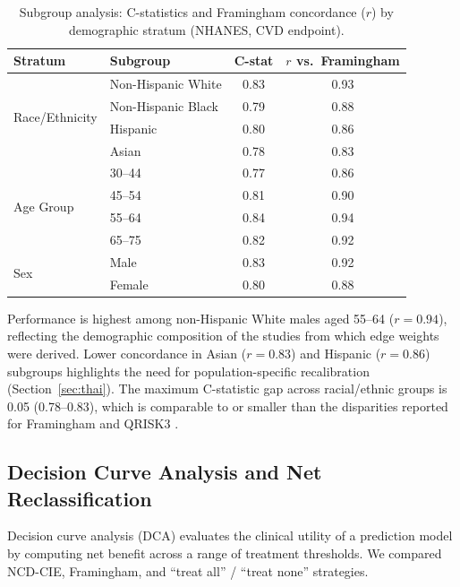 \documentclass[runningheads]{llncs}
\begin{document}
\begin{table}[t]
\centering
\caption{Subgroup analysis: C-statistics and Framingham concordance
($r$) by demographic stratum (NHANES, CVD endpoint).}
\label{tab:subgroup}
\small
\begin{tabular}{@{}llcc@{}}
\toprule
\textbf{Stratum} & \textbf{Subgroup} & \textbf{C-stat} & \textbf{$r$ vs.\ Framingham} \\
\midrule
\multirow{4}{*}{Race/Ethnicity}
  & Non-Hispanic White  & 0.83 & 0.93 \\
  & Non-Hispanic Black  & 0.79 & 0.88 \\
  & Hispanic            & 0.80 & 0.86 \\
  & Asian               & 0.78 & 0.83 \\
\midrule
\multirow{4}{*}{Age Group}
  & 30--44              & 0.77 & 0.86 \\
  & 45--54              & 0.81 & 0.90 \\
  & 55--64              & 0.84 & 0.94 \\
  & 65--75              & 0.82 & 0.92 \\
\midrule
\multirow{2}{*}{Sex}
  & Male                & 0.83 & 0.92 \\
  & Female              & 0.80 & 0.88 \\
\bottomrule
\end{tabular}
\end{table}

Performance is highest among non-Hispanic White males aged 55--64
($r = 0.94$), reflecting the demographic composition of the studies
from which edge weights were derived.  Lower concordance in Asian
($r = 0.83$) and Hispanic ($r = 0.86$) subgroups highlights the
need for population-specific recalibration
(Section~\ref{sec:thai}).  The maximum C-statistic gap across
racial/ethnic groups is 0.05 (0.78--0.83), which is comparable to
or smaller than the disparities reported for Framingham and QRISK3
\cite{hippisley2017qrisk3}.

\subsection{Decision Curve Analysis and Net Reclassification}
\label{sec:dca}

Decision curve analysis (DCA) \cite{vickers2006dca} evaluates the
clinical utility of a prediction model by computing net benefit across
a range of treatment thresholds.  We compared NCD-CIE, Framingham,
and ``treat all'' / ``treat none'' strategies.
\end{document}
